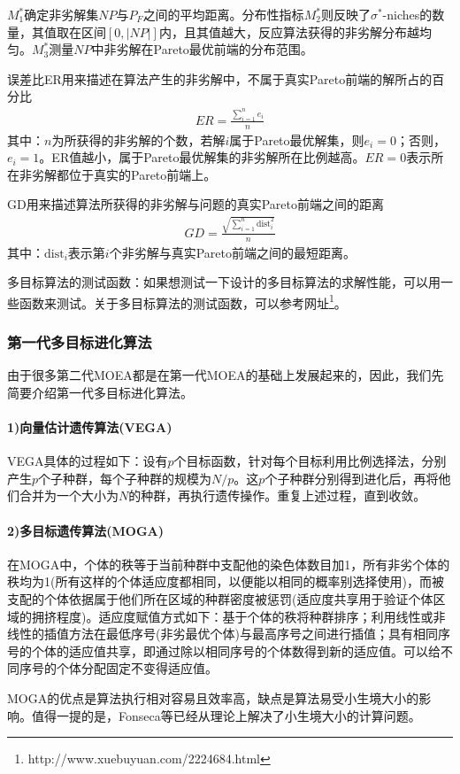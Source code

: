             \par
            $M_1^*$确定非劣解集$NP$与$P_F$之间的平均距离。分布性指标$M_2^*$则反映了$\sigma^*$-niches的数量，其值取在区间$[0,|NP|]$内，且其值越大，反应算法获得的非劣解分布越均匀。$M_3^*$测量$NP$中非劣解在Pareto最优前端的分布范围。
            \begin{definition}[误差比ER]
            误差比ER用来描述在算法产生的非劣解中，不属于真实Pareto前端的解所占的百分比
            \begin{align*}
            ER = \frac{\sum_{i=1}^ne_i}{n}
            \end{align*}
            其中：$n$为所获得的非劣解的个数，若解$i$属于Pareto最优解集，则$e_i=0$；否则，$e_i=1$。ER值越小，属于Pareto最优解集的非劣解所在比例越高。$ER=0$表示所在非劣解都位于真实的Pareto前端上。
            \end{definition}
            \begin{definition}[GD距离]
            GD用来描述算法所获得的非劣解与问题的真实Pareto前端之间的距离
            \begin{align*}
            GD = \frac{\sqrt{\sum_{i=1}^n\mathrm{dist}_i^2}}{n}
            \end{align*}
            其中：$\mathrm{dist}_i$表示第$i$个非劣解与真实Pareto前端之间的最短距离。
            \end{definition}
            \par
            多目标算法的测试函数：如果想测试一下设计的多目标算法的求解性能，可以用一些函数来测试。关于多目标算法的测试函数，可以参考网址\footnote{http://www.xuebuyuan.com/2224684.html}。
        \subsubsection{第一代多目标进化算法}
            \par
            由于很多第二代MOEA都是在第一代MOEA的基础上发展起来的，因此，我们先简要介绍第一代多目标进化算法。
            \paragraph{1)向量估计遗传算法(VEGA)}
            VEGA具体的过程如下：设有$p$个目标函数，针对每个目标利用比例选择法，分别产生$p$个子种群，每个子种群的规模为$N/p$。这$p$个子种群分别得到进化后，再将他们合并为一个大小为$N$的种群，再执行遗传操作。重复上述过程，直到收敛。
            \paragraph{2)多目标遗传算法(MOGA)}
            在MOGA中，个体的秩等于当前种群中支配他的染色体数目加1，所有非劣个体的秩均为1(所有这样的个体适应度都相同，以便能以相同的概率别选择使用)，而被支配的个体依据属于他们所在区域的种群密度被惩罚(适应度共享用于验证个体区域的拥挤程度)。适应度赋值方式如下：基于个体的秩将种群排序；利用线性或非线性的插值方法在最低序号(非劣最优个体)与最高序号之间进行插值；具有相同序号的个体的适应值共享，即通过除以相同序号的个体数得到新的适应值。可以给不同序号的个体分配固定不变得适应值。
            \par
            MOGA的优点是算法执行相对容易且效率高，缺点是算法易受小生境大小的影响。值得一提的是，Fonseca等已经从理论上解决了小生境大小的计算问题。
